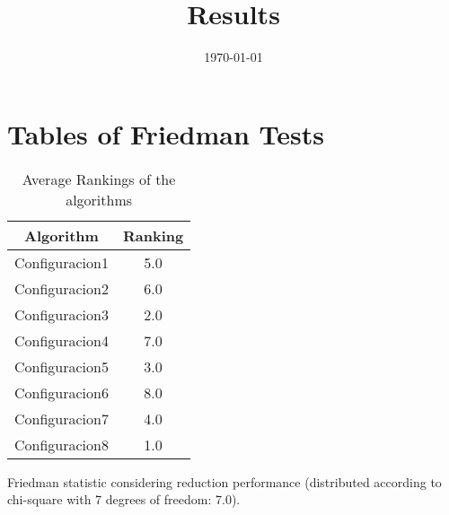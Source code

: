 \documentclass{article}
\title{Results}
\author{}
\date{\today}
\begin{document}
\oddsidemargin 0in \topmargin 0in\maketitle
\section{Tables of Friedman Tests}
\begin{table}[!htp]
\centering
\caption{Average Rankings of the algorithms
}\begin{tabular}{c|c}
Algorithm&Ranking\\
\hline
Configuracion1&5.0\\
Configuracion2&6.0\\
Configuracion3&2.0\\
Configuracion4&7.0\\
Configuracion5&3.0\\
Configuracion6&8.0\\
Configuracion7&4.0\\
Configuracion8&1.0\\
\end{tabular}
\end{table}


Friedman statistic considering reduction performance (distributed according to chi-square with 7 degrees of freedom: 7.0).
\end{document}
